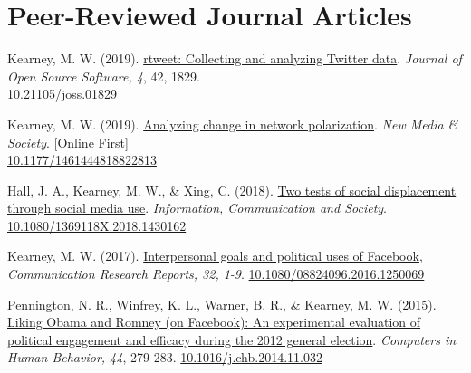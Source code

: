 \section{Peer-Reviewed Journal Articles}
\begin{bibenum}

\item Kearney, M. W. (2019).
	\href{https://joss.theoj.org/papers/10.21105/joss.01829}{rtweet: Collecting and analyzing Twitter data}.
	\textit{Journal of Open Source Software, 4}, 42, 1829.\\
	\href{https://doi.org/10.21105/joss.01829}{10.21105/joss.01829}

\item Kearney, M. W. (2019).
	\href{https://doi.org/10.1177/1461444818822813}{Analyzing change in network polarization}.
	\textit{New Media \& Society}. [Online First]\\
	\href{https://doi.org/10.1177/1461444818822813}{10.1177/1461444818822813}

\item Hall, J. A., Kearney, M. W., \& Xing, C. (2018).
	\href{https://www.tandfonline.com/doi/abs/10.1080/1369118X.2018.1430162}{Two tests of social displacement through social media use}.
	\textit{Information, Communication and Society}.
	\href{https://doi.org/10.1080/1369118X.2018.1430162}{10.1080/1369118X.2018.1430162}

\item Kearney, M. W. (2017).
	\href{http://www.tandfonline.com/doi/abs/10.1080/08824096.2016.1250069}{Interpersonal goals and political uses of Facebook},
	\textit{Communication Research Reports, 32, 1-9}.
	\href{https://doi.org/10.1080/08824096.2016.1250069}{10.1080/08824096.2016.1250069}

\item Pennington, N. R., Winfrey, K. L., Warner, B. R., \& Kearney, M. W. (2015).
	\href{https://www.sciencedirect.com/science/article/pii/S0747563214006347}{Liking Obama and Romney (on Facebook): An experimental evaluation of political engagement and efficacy during the 2012 general election}.
	\textit{Computers in Human Behavior, 44}, 279-283.
	\href{https://doi.org/10.1016/j.chb.2014.11.032}{10.1016/j.chb.2014.11.032}


\end{bibenum}
